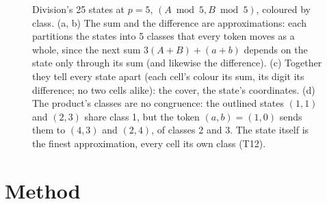 \documentclass[11pt]{article}
\begin{document}
\begin{figure}[t]
\centering
{}
\caption{Division's 25 states at $p = 5$, $(A \bmod 5, B \bmod 5)$, coloured by class. (a, b) The
sum and the difference are approximations: each partitions the states into 5 classes that every
token moves as a whole, since the next sum $3(A + B) + (a + b)$ depends on the state only through
its sum (and likewise the difference). (c) Together they tell every state apart (each cell's colour its
sum, its digit its difference; no two cells alike): the cover, the state's coordinates. (d) The product's classes are no
congruence: the outlined states $(1, 1)$ and $(2, 3)$ share class 1, but the token $(a, b) = (1, 0)$
sends them to $(4, 3)$ and $(2, 4)$, of classes 2 and 3. The state itself is the finest
approximation, every cell its own class (T12).}
\label{fig:approximations}
\end{figure}

\section{Method}
\label{sec:method}
\end{document}
